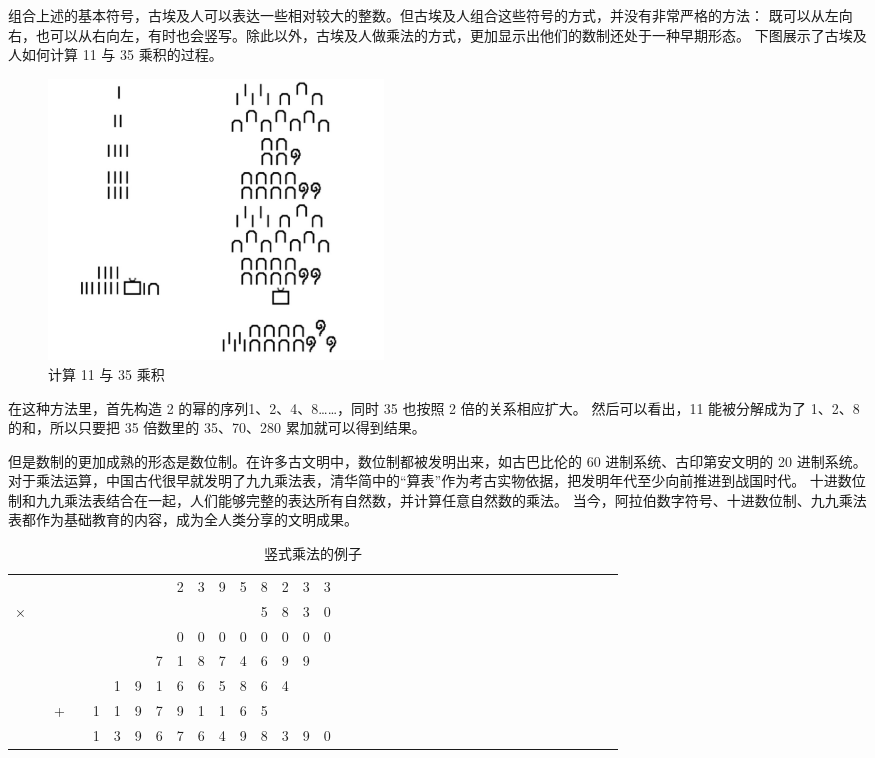 \documentclass[a4paper,12pt]{article}
\begin{document}
组合上述的基本符号，古埃及人可以表达一些相对较大的整数。但古埃及人组合这些符号的方式，并没有非常严格的方法：
既可以从左向右，也可以从右向左，有时也会竖写。除此以外，古埃及人做乘法的方式，更加显示出他们的数制还处于一种早期形态。
下图展示了古埃及人如何计算 11 与 35 乘积的过程。

\begin{figure}[ht]
\centering
\includegraphics[width=3.5in]{images/ancient_egypt_multiplication.jpg}
\caption{计算 11 与 35 乘积}
\end{figure}

在这种方法里，首先构造 2 的幂的序列1、2、4、8……，同时 35 也按照 2 倍的关系相应扩大。
然后可以看出，11 能被分解成为了 1、2、8 的和，所以只要把 35 倍数里的 35、70、280 累加就可以得到结果。

但是数制的更加成熟的形态是数位制。在许多古文明中，数位制都被发明出来，如古巴比伦的 60 进制系统、古印第安文明的 20 进制系统。
对于乘法运算，中国古代很早就发明了九九乘法表，清华简中的“算表”作为考古实物依据，把发明年代至少向前推进到战国时代。
十进数位制和九九乘法表结合在一起，人们能够完整的表达所有自然数，并计算任意自然数的乘法。
当今，阿拉伯数字符号、十进数位制、九九乘法表都作为基础教育的内容，成为全人类分享的文明成果。

\begin{table}[tbhp]
\centering
\begin{tabular}{cccccccccccccccccccccccccccccccccccc}
  &   &   &   &   &   &   &   & 2 & 3 & 9 & 5 & 8 & 2 & 3 & 3\\
× &   &   &   &   &   &   &   &   &   &   &   & 5 & 8 & 3 & 0\\
\hline
  &   &   &   &   &   &   &   & 0 & 0 & 0 & 0 & 0 & 0 & 0 & 0\\
  &   &   &   &   &   &   & 7 & 1 & 8 & 7 & 4 & 6 & 9 & 9 &  \\
  &   &   &   &   & 1 & 9 & 1 & 6 & 6 & 5 & 8 & 6 & 4 &   &  \\
  &   & + &   & 1 & 1 & 9 & 7 & 9 & 1 & 1 & 6 & 5 &   &   &  \\
\hline
  &   &   &   & 1 & 3 & 9 & 6 & 7 & 6 & 4 & 9 & 8 & 3 & 9 & 0\\
\end{tabular}
\caption{竖式乘法的例子}
\end{table}
\end{document}
